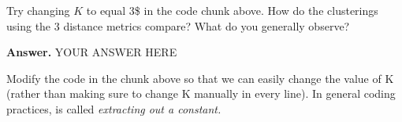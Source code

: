 \documentclass[
  letterpaper,
  DIV=11,
  numbers=noendperiod]{scrartcl}
\begin{document}
Try changing \(K\) to equal 3\$ in the code chunk above. How do the
clusterings using the 3 distance metrics compare? What do you generally
observe?

\textbf{Answer.} YOUR ANSWER HERE

Modify the code in the chunk above so that we can easily change the
value of K (rather than making sure to change K manually in every line).
In general coding practices, is called \emph{extracting out a constant.}
\end{document}
